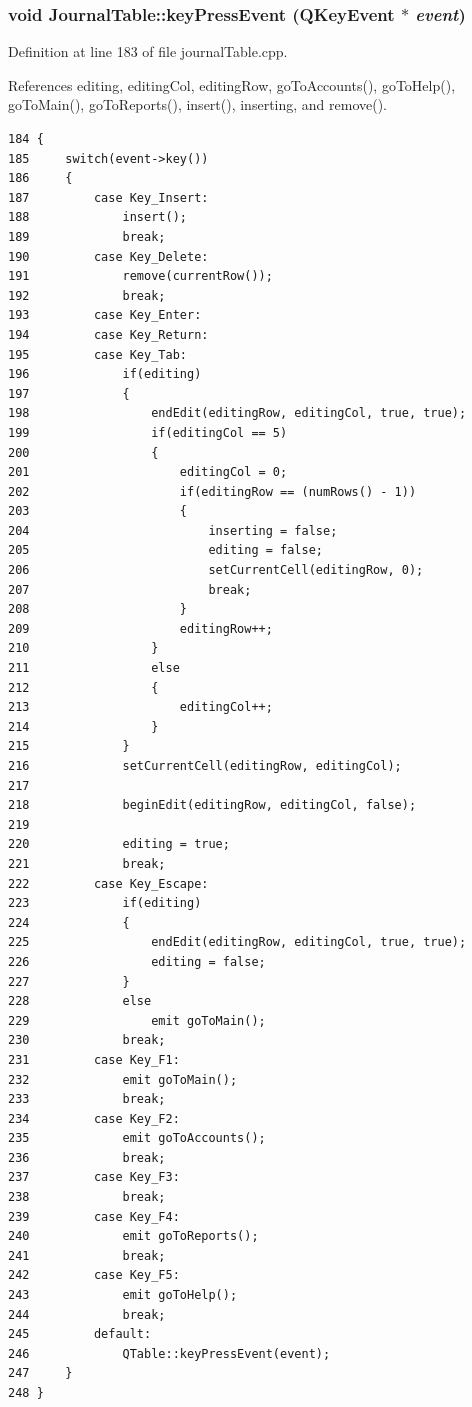 \hypertarget{classJournalTable_d2}{
\subsubsection[keyPressEvent]{\setlength{\rightskip}{0pt plus 5cm}void Journal\-Table::key\-Press\-Event (QKey\-Event $\ast$ {\em event})}}
\label{classJournalTable_d2}


Definition at line 183 of file journal\-Table.cpp.

References editing, editing\-Col, editing\-Row, go\-To\-Accounts(), go\-To\-Help(), go\-To\-Main(), go\-To\-Reports(), insert(), inserting, and remove().

\footnotesize\begin{verbatim}184 {
185     switch(event->key())
186     {
187         case Key_Insert:
188             insert();
189             break;
190         case Key_Delete:
191             remove(currentRow());
192             break;
193         case Key_Enter:
194         case Key_Return:
195         case Key_Tab:
196             if(editing)
197             {
198                 endEdit(editingRow, editingCol, true, true);
199                 if(editingCol == 5)
200                 {
201                     editingCol = 0;
202                     if(editingRow == (numRows() - 1))
203                     {
204                         inserting = false;
205                         editing = false;
206                         setCurrentCell(editingRow, 0);
207                         break;
208                     }
209                     editingRow++;
210                 }
211                 else
212                 {
213                     editingCol++;
214                 }
215             }
216             setCurrentCell(editingRow, editingCol);
217 
218             beginEdit(editingRow, editingCol, false);
219 
220             editing = true;
221             break;
222         case Key_Escape:
223             if(editing)
224             {
225                 endEdit(editingRow, editingCol, true, true);
226                 editing = false;
227             }
228             else
229                 emit goToMain();
230             break;
231         case Key_F1:
232             emit goToMain();
233             break;
234         case Key_F2:
235             emit goToAccounts();
236             break;
237         case Key_F3:
238             break;
239         case Key_F4:
240             emit goToReports();
241             break;
242         case Key_F5:
243             emit goToHelp();
244             break;
245         default:
246             QTable::keyPressEvent(event);
247     }
248 }
\end{verbatim}\normalsize 


